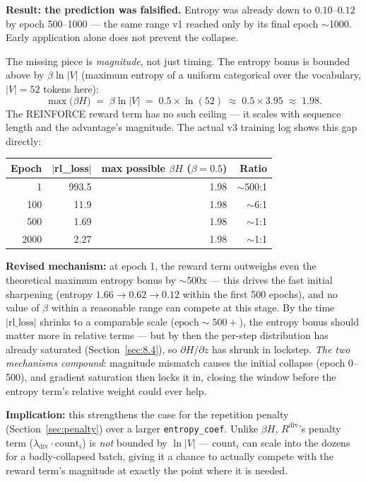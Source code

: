 \documentclass[11pt]{article}
\newcommand{\code}[1]{\texttt{#1}}
\begin{document}
\textbf{Result: the prediction was falsified.} Entropy was already down to $0.10$--$0.12$ by epoch 500--1000 --- the same range v1 reached only by its final epoch $\sim$1000. Early application alone does not prevent the collapse.

The missing piece is \emph{magnitude}, not just timing. The entropy bonus is bounded above by $\beta \ln|V|$ (maximum entropy of a uniform categorical over the vocabulary, $|V|=52$ tokens here):
\[
  \max\bigl(\beta H\bigr) \;=\; \beta \ln|V| \;=\; 0.5 \times \ln(52) \;\approx\; 0.5 \times 3.95 \;\approx\; 1.98.
\]
The REINFORCE reward term has no such ceiling --- it scales with sequence length and the advantage's magnitude. The actual v3 training log shows this gap directly:

\begin{center}
\begin{tabular}{@{}r r r r@{}}
\toprule
\textbf{Epoch} & \textbf{$|$rl\_loss$|$} & \textbf{max possible $\beta H$ ($\beta=0.5$)} & \textbf{Ratio} \\
\midrule
1 & 993.5 & 1.98 & $\sim$500:1 \\
100 & 11.9 & 1.98 & $\sim$6:1 \\
500 & 1.69 & 1.98 & $\sim$1:1 \\
2000 & 2.27 & 1.98 & $\sim$1:1 \\
\bottomrule
\end{tabular}
\end{center}

\textbf{Revised mechanism:} at epoch 1, the reward term outweighs even the theoretical maximum entropy bonus by $\sim$500x --- this drives the fast initial sharpening (entropy $1.66\to0.62\to0.12$ within the first 500 epochs), and no value of $\beta$ within a reasonable range can compete at this stage. By the time $|\text{rl\_loss}|$ shrinks to a comparable scale ($\text{epoch}\sim500{+}$), the entropy bonus should matter more in relative terms --- but by then the per-step distribution has already saturated (Section~\ref{sec:8.4}), so $\partial H/\partial z$ has shrunk in lockstep. \emph{The two mechanisms compound}: magnitude mismatch causes the initial collapse (epoch 0--500), and gradient saturation then locks it in, closing the window before the entropy term's relative weight could ever help.

\textbf{Implication:} this strengthens the case for the repetition penalty (Section~\ref{sec:penalty}) over a larger \code{entropy\_coef}. Unlike $\beta H$, $R^{\mathrm{div}}$'s penalty term ($\lambda_{\mathrm{div}} \cdot \mathrm{count}_i$) is \emph{not} bounded by $\ln|V|$ --- $\mathrm{count}_i$ can scale into the dozens for a badly-collapsed batch, giving it a chance to actually compete with the reward term's magnitude at exactly the point where it is needed.
\end{document}
